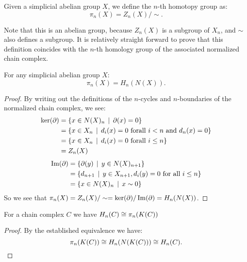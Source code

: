 
\begin{definition}
	Given a simplicial abelian group $X$, we define the $n$-th homotopy group as:
	$$ \pi_n(X) = Z_n(X) / \sim. $$
\end{definition}

Note that this is an abelian group, because $Z_n(X)$ is a subgroup of $X_n$, and $\sim$ also defines a subgroup. It is relatively straight forward to prove that this definition coincides with the $n$-th homology group of the associated normalized chain complex.

\begin{lemma}
	For any simplicial abelian group $X$:
	$$ \pi_n(X) = H_n(N(X)). $$
\end{lemma}
\begin{proof}
	By writing out the definitions of the $n$-cycles and $n$-boundaries of the normalized chain complex, we see:
	\begin{align*}
		\ker(\partial) &= \{ x \in N(X)_n \,\mid\, \partial(x) = 0 \} \\
			&= \{ x \in X_n \,\mid\, d_i(x) = 0 \text{ forall } i < n \text{ and } d_n(x) = 0 \} \\
			&= \{ x \in X_n \,\mid\, d_i(x) = 0 \text{ forall } i \leq n \} \\
			&= Z_n(X)
	\end{align*}
	\begin{align*}
		\operatorname{Im}(\partial) &= \{ \partial(y) \,\mid\, y \in N(X)_{n+1} \} \\
			&= \{ d_{n+1} \,\mid\, y \in X_{n+1}, d_i(y) = 0 \text{ for all } i \leq n \} \\
			&= \{ x \in N(X)_n \,\mid\, x \sim 0 \}
	\end{align*}
	So we see that $\pi_n(X) = Z_n(X) / \sim = \ker(\partial) / \operatorname{Im}(\partial) = H_n(N(X))$.
\end{proof}

\begin{corollary}
	For a chain complex $C$ we have $H_n(C) \cong \pi_n(K(C))$
\end{corollary}
\begin{proof}
	By the established equivalence we have:
	$$ \pi_n(K(C)) \cong H_n(N(K(C))) \cong H_n(C). $$
\end{proof}


